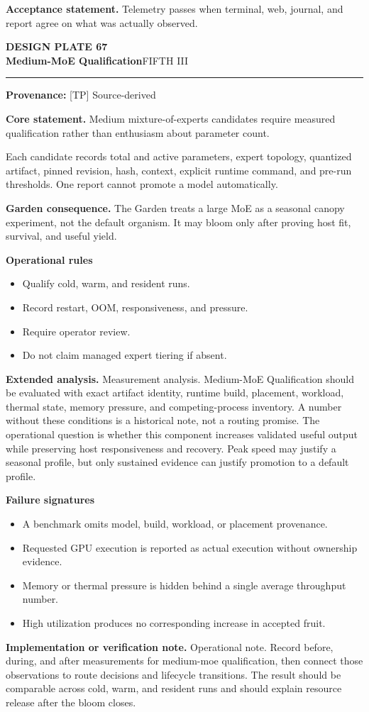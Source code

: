 \documentclass[10pt,letterpaper,oneside]{article}
\newcommand{\prov}[1]{\textcolor{gardenBlue}{\sffamily\footnotesize\textbf{Provenance:} #1}}
\newcommand{\platetitle}[3]{%
  \begin{minipage}[t][0.54in][t]{\textwidth}
  {\sffamily\bfseries\color{gardenDeep}\fontsize{9}{10}\selectfont DESIGN PLATE #1}\\[-1pt]
  {\sffamily\bfseries\color{gardenInk}\fontsize{16.5}{18}\selectfont #2}\hfill{\sffamily\color{gardenGreen}\large #3}
  \end{minipage}\vspace{-2pt}\hrule\vspace{5pt}}
\begin{document}
\begin{acceptbox}
\textbf{Acceptance statement.} Telemetry passes when terminal, web, journal, and report agree on what was actually observed.
\end{acceptbox}
\newpage
\platetitle{67}{Medium-MoE Qualification}{FIFTH III}
\prov{[TP] Source-derived}
\fontsize{8.85}{10.45}\selectfont
\begin{corebox}
\textbf{Core statement.} Medium mixture-of-experts candidates require measured qualification rather than enthusiasm about parameter count.
\end{corebox}
Each candidate records total and active parameters, expert topology, quantized artifact, pinned revision, hash, context, explicit runtime command, and pre-run thresholds. One report cannot promote a model automatically.

\textbf{Garden consequence.} The Garden treats a large MoE as a seasonal canopy experiment, not the default organism. It may bloom only after proving host fit, survival, and useful yield.

\textbf{Operational rules}
\begin{itemize}
\item Qualify cold, warm, and resident runs.
\item Record restart, OOM, responsiveness, and pressure.
\item Require operator review.
\item Do not claim managed expert tiering if absent.
\end{itemize}
\textbf{Extended analysis.} Measurement analysis. Medium-MoE Qualification should be evaluated with exact artifact identity, runtime build, placement, workload, thermal state, memory pressure, and competing-process inventory. A number without these conditions is a historical note, not a routing promise. The operational question is whether this component increases validated useful output while preserving host responsiveness and recovery. Peak speed may justify a seasonal profile, but only sustained evidence can justify promotion to a default profile.

\textbf{Failure signatures}
\begin{itemize}
\item A benchmark omits model, build, workload, or placement provenance.
\item Requested GPU execution is reported as actual execution without ownership evidence.
\item Memory or thermal pressure is hidden behind a single average throughput number.
\item High utilization produces no corresponding increase in accepted fruit.
\end{itemize}
\textbf{Implementation or verification note.} Operational note. Record before, during, and after measurements for medium-moe qualification, then connect those observations to route decisions and lifecycle transitions. The result should be comparable across cold, warm, and resident runs and should explain resource release after the bloom closes.
\end{document}
